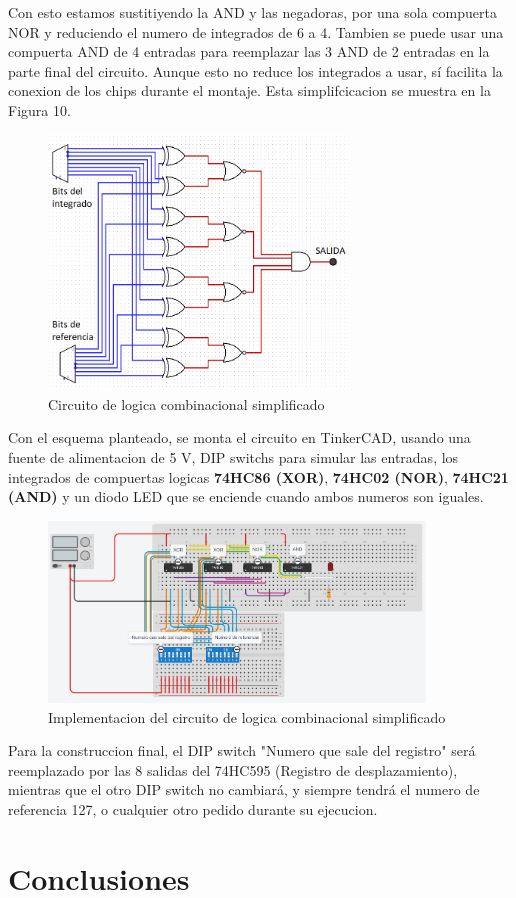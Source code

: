 \documentclass{article}
\begin{document}
Con esto estamos sustitiyendo la AND y las negadoras, por una sola compuerta NOR y reduciendo el numero de integrados de 6 a 4. Tambien se puede usar una compuerta AND de 4 entradas para reemplazar las 3 AND de 2 entradas en la parte final del circuito. Aunque esto no reduce los integrados a usar, sí facilita la conexion de los chips durante el montaje. Esta simplifcicacion se muestra en la Figura 10.

\begin{figure}[!hb] 
\includegraphics[width=8cm]{logica2.png}
\centering
\caption{Circuito de logica combinacional simplificado}
\end{figure}

Con el esquema planteado, se monta el circuito en TinkerCAD, usando una fuente de alimentacion de 5 V, DIP switchs para simular las entradas, los integrados de compuertas logicas \textbf{74HC86 (XOR)}, \textbf{74HC02 (NOR)}, \textbf{74HC21 (AND)} y un diodo LED que se enciende cuando ambos numeros son iguales.\\

\begin{figure}[!ht] 
\includegraphics[width=10cm]{montajeCompuertas.PNG}
\centering
\caption{Implementacion del circuito de logica combinacional simplificado}
\end{figure}

Para la construccion final, el DIP switch "Numero que sale del registro" será reemplazado por las 8 salidas del 74HC595 (Registro de desplazamiento), mientras que el otro DIP switch no cambiará, y siempre tendrá el numero de referencia 127, o cualquier otro pedido durante su ejecucion.

\section{Conclusiones} \label{conclusiones}



\end{document}
